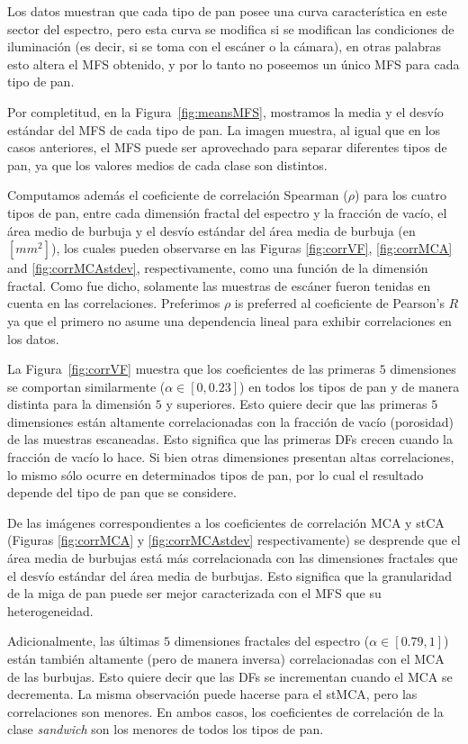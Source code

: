 \documentclass[spanish,a4paper,11pt,oneside,links]{report}
\begin{document}
Los datos muestran que cada tipo de pan posee una curva característica en este sector del espectro, pero esta curva se modifica si se modifican las condiciones de iluminación (es decir, si se toma con el escáner o la cámara), en otras palabras esto altera el MFS obtenido, y por lo tanto no poseemos un único MFS para cada tipo de pan. 

Por completitud, en la Figura~\ref{fig:meansMFS}, mostramos la media y el desvío estándar del MFS de cada tipo de pan. La imagen muestra, al igual que en los casos anteriores, el MFS puede ser aprovechado para separar diferentes tipos de pan, ya que los valores medios de cada clase son distintos.

Computamos además el coeficiente de correlación Spearman ($\rho$) para los cuatro tipos de pan, entre cada dimensión fractal del espectro y la fracción de vacío, el área medio de burbuja y el desvío estándar del área media de burbuja (en $[mm^{2}]$), los cuales pueden observarse en las Figuras \ref{fig:corrVF}, \ref{fig:corrMCA} and \ref{fig:corrMCAstdev}, respectivamente, como una función de la dimensión fractal. Como fue dicho, solamente las muestras de escáner fueron tenidas en cuenta en las correlaciones. Preferimos $\rho$ is preferred al coeficiente de Pearson's $R$ ya que el primero no asume una dependencia lineal para exhibir correlaciones en los datos.

La Figura~\ref{fig:corrVF} muestra que los coeficientes de las primeras $5$ dimensiones se comportan similarmente ($\alpha \in [0,0.23]$) en todos los tipos de pan y de manera distinta para la dimensión $5$ y superiores. Esto quiere decir que las primeras $5$ dimensiones están altamente correlacionadas con la fracción de vacío (porosidad) de las muestras escaneadas. Esto significa que las primeras DFs crecen cuando la fracción de vacío lo hace. Si bien otras dimensiones presentan altas correlaciones, lo mismo sólo ocurre en determinados tipos de pan, por lo cual el resultado depende del tipo de pan que se considere.

De las imágenes correspondientes a los coeficientes de correlación MCA y stCA (Figuras \ref{fig:corrMCA} y \ref{fig:corrMCAstdev} respectivamente) se desprende que el área media de burbujas está más correlacionada con las dimensiones fractales que el desvío estándar del área media de burbujas. Esto significa que la granularidad de la miga de pan puede ser mejor caracterizada con el MFS que su heterogeneidad.

Adicionalmente, las últimas $5$ dimensiones fractales  del espectro ($\alpha \in [0.79,1]$) están también altamente (pero de manera inversa) correlacionadas con el MCA de las burbujas. Esto quiere decir que las DFs se incrementan cuando el MCA se decrementa. La misma observación puede hacerse para el stMCA, pero las correlaciones son menores. En ambos casos, los coeficientes de correlación de la clase {\em sandwich} son los menores de todos los tipos de pan.
\end{document}
